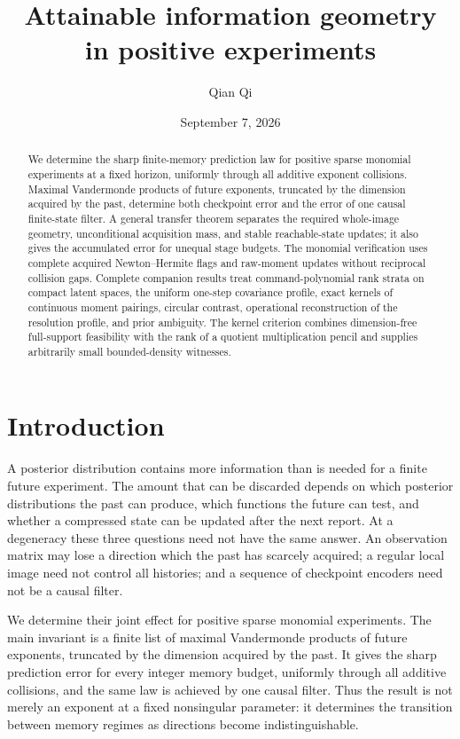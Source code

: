 \documentclass[11pt]{amsart}
\title[Attainable information geometry]{Attainable information geometry\\ in positive experiments}
\author{Qian Qi}
\date{September 7, 2026}
\theoremstyle{definition}\newtheorem{definition}[theorem]{Definition}
\theoremstyle{remark}\newtheorem{remark}[theorem]{Remark}
\begin{document}
\begin{abstract}
We determine the sharp finite-memory prediction law for positive sparse
monomial experiments at a fixed horizon, uniformly through all additive
exponent collisions. Maximal Vandermonde products of future exponents,
truncated by the dimension acquired by the past, determine both
checkpoint error and the error of one causal finite-state filter.
A general transfer theorem separates the required whole-image geometry,
unconditional acquisition mass, and stable reachable-state updates; it
also gives the accumulated error for unequal stage budgets. The monomial
verification uses complete acquired Newton--Hermite flags and raw-moment
updates without reciprocal collision gaps. Complete companion results
treat command-polynomial rank strata on compact latent spaces, the
uniform one-step covariance profile, exact kernels of continuous moment
pairings, circular contrast, operational reconstruction of the resolution
profile, and prior ambiguity. The kernel criterion combines dimension-free
full-support feasibility with the rank of a quotient multiplication
pencil and supplies arbitrarily small bounded-density witnesses.
\end{abstract}
\maketitle
\section{Introduction}
A posterior distribution contains more information than is needed for a
finite future experiment. The amount that can be discarded depends on
which posterior distributions the past can produce, which functions the
future can test, and whether a compressed state can be updated after the
next report. At a degeneracy these three questions need not have the
same answer. An observation matrix may lose a direction which the past
has scarcely acquired; a regular local image need not control all
histories; and a sequence of checkpoint encoders need not be a causal
filter.

We determine their joint effect for positive sparse monomial experiments.
The main invariant is a finite list of maximal Vandermonde products of
future exponents, truncated by the dimension acquired by the past. It
gives the sharp prediction error for every integer memory budget,
uniformly through all additive collisions, and the same law is achieved
by one causal filter. Thus the result is not merely an exponent at a
fixed nonsingular parameter: it determines the transition between
memory regimes as directions become indistinguishable.
\end{document}
